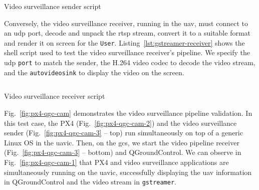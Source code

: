 
\begin{longlisting}
\centering
\inputminted[]{bash}{./listing/gstreamerSender.sh}
\caption{Video surveillance sender script}
\label{lst:gstreamer-sender}
\end{longlisting}

Conversely, the video surveillance receiver, running in the \gls{uav}, must
connect to an \gls{udp} port, decode and unpack the \gls{rtsp} stream, convert
it to a suitable format and render it on screen for the \texttt{User}.
Listing~\ref{lst:gstreamer-receiver}
shows the shell script used to test the video surveillance receiver's
pipeline. We specify the \gls{udp} \texttt{port} to match the sender, the H.264
video codec to decode the video stream, and the \texttt{autovideosink} to
display the video on the screen.

\begin{longlisting}
\centering
\inputminted[]{bash}{./listing/gstreamerReceiver.sh}
\caption{Video surveillance receiver script}
\label{lst:gstreamer-receiver}
\end{longlisting}


Fig.~\ref{fig:px4-qgc-cam} demonstrates the video surveillance pipeline
validation. In this test case, the PX4 (Fig.~\ref{fig:px4-qgc-cam-2}) and the video
surveillance sender (Fig.~\ref{fig:px4-qgc-cam-3} -- top) run
simultaneously on top of a generic Linux OS in the \gls{uavic}. Then, on the \gls{gcs}, we start
the video pipeline receiver (Fig.~\ref{fig:px4-qgc-cam-3} -- bottom) and
QGroundControl. We can observe in Fig.~\ref{fig:px4-qgc-cam-1} that PX4 and video
surveillance applications are simultaneously running on the \gls{uavic},
successfully displaying the \gls{uav} information in QGroundControl and the video stream in \texttt{gstreamer}.

